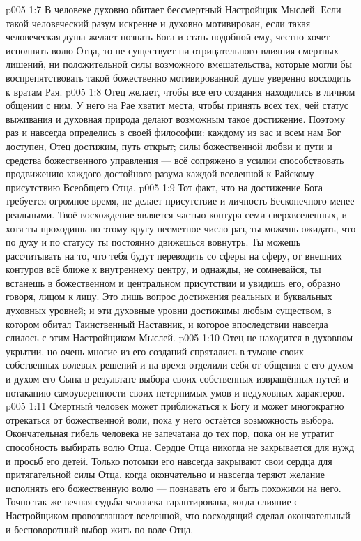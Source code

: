 \vs p005 1:7 В человеке духовно обитает бессмертный Настройщик Мыслей. Если такой человеческий разум искренне и духовно мотивирован, если такая человеческая душа желает познать Бога и стать подобной ему, честно хочет исполнять волю Отца, то не существует ни отрицательного влияния смертных лишений, ни положительной силы возможного вмешательства, которые могли бы воспрепятствовать такой божественно мотивированной душе уверенно восходить к вратам Рая.
\vs p005 1:8 Отец желает, чтобы все его создания находились в личном общении с ним. У него на Рае хватит места, чтобы принять всех тех, чей статус выживания и духовная природа делают возможным такое достижение. Поэтому раз и навсегда определись в своей философии: каждому из вас и всем нам Бог доступен, Отец достижим, путь открыт; силы божественной любви и пути и средства божественного управления --- всё сопряжено в усилии способствовать продвижению каждого достойного разума каждой вселенной к Райскому присутствию Всеобщего Отца.
\vs p005 1:9 Тот факт, что на достижение Бога требуется огромное время, не делает присутствие и личность Бесконечного менее реальными. Твоё восхождение является частью контура семи сверхвселенных, и хотя ты проходишь по этому кругу несметное число раз, ты можешь ожидать, что по духу и по статусу ты постоянно движешься вовнутрь. Ты можешь рассчитывать на то, что тебя будут переводить со сферы на сферу, от внешних контуров всё ближе к внутреннему центру, и однажды, не сомневайся, ты встанешь в божественном и центральном присутствии и увидишь его, образно говоря, лицом к лицу. Это лишь вопрос достижения реальных и буквальных духовных уровней; и эти духовные уровни достижимы любым существом, в котором обитал Таинственный Наставник, и которое впоследствии навсегда слилось с этим Настройщиком Мыслей.
\vs p005 1:10 \pc Отец не находится в духовном укрытии, но очень многие из его созданий спрятались в тумане своих собственных волевых решений и на время отделили себя от общения с его духом и духом его Сына в результате выбора своих собственных извращённых путей и потаканию самоуверенности своих нетерпимых умов и недуховных характеров.
\vs p005 1:11 Смертный человек может приближаться к Богу и может многократно отрекаться от божественной воли, пока у него остаётся возможность выбора. Окончательная гибель человека не запечатана до тех пор, пока он не утратит способность выбирать волю Отца. Сердце Отца никогда не закрывается для нужд и просьб его детей. Только потомки его навсегда закрывают свои сердца для притягательной силы Отца, когда окончательно и навсегда теряют желание исполнять его божественную волю --- познавать его и быть похожими на него. Точно так же вечная судьба человека гарантирована, когда слияние с Настройщиком провозглашает вселенной, что восходящий сделал окончательный и бесповоротный выбор жить по воле Отца.
